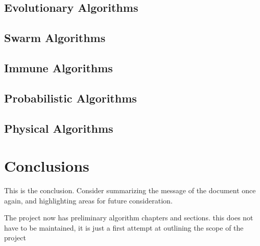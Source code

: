 \documentclass[a4paper, 11pt]{article}
\begin{document}
\subsection{Evolutionary Algorithms}

\subsection{Swarm Algorithms}

\subsection{Immune Algorithms}

\subsection{Probabilistic Algorithms}

\subsection{Physical Algorithms}


\section{Conclusions}
\label{sec:conclusions}
This is the conclusion. Consider summarizing the message of the document once again, and highlighting areas for future consideration.

The project now has preliminary algorithm chapters and sections.
this does not have to be maintained, it is just a first attempt at outlining the scope of the project




\end{document}
